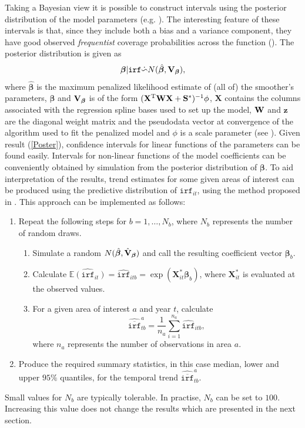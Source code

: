 Taking a Bayesian view it is possible to construct intervals using the posterior distribution of the model parameters (e.g. \cite{rwc}). The interesting feature of these intervals is that, since they include both a bias and a variance component, they have good observed \textit{frequentist} coverage probabilities across the function (\cite{Marra2011}). The posterior distribution is given as
\begin{equation}
\bm\beta|\texttt{irf} \dot{\backsim} N( \hat{\bm\beta}, {\bf V}_{\bm\beta} ),
\label{Poster}
\end{equation}
where $\hat{\bm\beta}$ is the maximum penalized likelihood estimate of (all of) the smoother's parameters, $\bm\beta$ and ${\bf V}_{\bm\beta}$ is of the form $(\mathbf{X}^\text{T}{\bf W}\mathbf{X}+{\bf S}^*)^{-1}\phi$, $\mathbf{X}$ contains the columns associated with the regression spline bases used to set up the model, ${\bf W}$ and $\mathbf{z}$ are the diagonal weight matrix and the pseudodata vector at convergence of the algorithm used to fit the penalized model and $\phi$ is a scale parameter (see ). Given result (\ref{Poster}), confidence intervals for linear functions of the parameters can be found easily. Intervals for non-linear functions of the model coefficients can be conveniently obtained by simulation from the posterior distribution of $\bm\beta$. To aid interpretation of the results, trend estimates for some given areas of interest can be produced using the predictive distribution of $\texttt{irf}_{it}$, using the method proposed in . This approach can be implemented as follows:

\begin{enumerate}
	\item Repeat the following steps for $b=1,\ldots,N_b$, where $N_b$ represents the number of random draws. 
	   \begin{enumerate}
	      \item Simulate a random $N(\hat{\bm\beta}, \hat{{\bf V}}_{\bm\beta} )$ and call the resulting coefficient vector $\bm\beta_b$.
	      \item Calculate $\widehat{\mathbb{E}(\texttt{irf}_{it})}=\widehat{\texttt{irf}}_{itb}=\exp(\mathbf{X}^*_{it}\bm\beta_b)$, where $\mathbf{X}^*_{it}$ is evaluated at the observed values. 
	      \item For a given area of interest $a$ and year $t$, calculate
	      $$\widehat{\overline{\texttt{irf}}}_{tb}^a=\frac{1}{n_a}\sum_{i=1}^{n_a} \widehat{\texttt{irf}}_{itb},$$
	      where $n_a$ represents the number of observations in area $a$.     
	   \end{enumerate}
	\item Produce the required summary statistics, in this case median, lower and upper $95\%$ quantiles, for the temporal trend $\widehat{\overline{\texttt{irf}}}_{tb}^a$.
\end{enumerate}
Small values for $N_b$ are typically tolerable. In practise, $N_b$ can be set to $100$. Increasing this value does not change the results which are presented in the next section.
 

